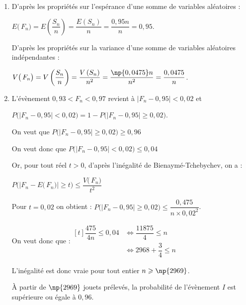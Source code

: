 \begin{enumerate}
	\begin{enumerate}
		\item D'après les propriétés sur l'espérance d'une somme de variables aléatoires :

$E\big(\,F_{n}\big)= E\left(\dfrac{S_{n}}{n}\right) = \dfrac{E\left( S_{n}\right)}{n}= \dfrac{0,95n}{n}= 0,95 $.

D'après les propriétés sur la variance d'une somme de variables aléatoires indépendantes :

$V\big(\,F_{n}\big)= V\left(\dfrac{S_{n}}{n}\right) = \dfrac{V\left( S_{n}\right)}{n^2}= \dfrac{\np{0,0475}n}{n^2}= \dfrac{0,0475}{n}$.

	\item L'évènement \og $0,93 <F_{n}< 0,97$ \fg{} revient à $\big|F_{n} - 0,95 \big| < 0,02$ et

$P\Big(\big|F_n - 0,95 \big| < 0,02\Big) = 1 - P\Big(\big|F_{n} - 0,95 \big| \geqslant 0,02\Big)$.

On veut que $P\Big(\big|F_{n} - 0,95 \big| \geqslant 0,02\Big) \geqslant 0,96$

On veut donc que $P\Big(\big|F_n - 0,95 \big| < 0,02\Big) \leqslant 0,04$

Or, pour tout réel $t > 0$, d'après l'inégalité de Bienaymé-Tchebychev, on a :

$P\Big(\big|F_n-E\big(\,F_n\big)\big| \geqslant t\Big) \leqslant \dfrac{V\big(\,F_n\big)}{t^2}$

Pour $t = 0,02$ on obtient : $ P\Big(\big|F_n-0,95\big| \geqslant 0,02\Big)\leqslant \dfrac{0,475}{ n \times 0,02^2}$.

On veut donc que :\quad $\begin{aligned}[t]
		\dfrac{475}{4 n} \leqslant 0,04 &\iff
		\dfrac{11875}{4} \leqslant n \\
		&\iff 2968+\dfrac{3}{4}\leqslant n
	\end{aligned}$

L'inégalité est donc vraie pour tout entier $n \geqslant \np{2969}$.

À partir de $\np{2969}$ jouets prélevés, la probabilité de l'évènement $I$ est supérieure ou égale à $0,96$.
	\end{enumerate}
\end{enumerate}

\medskip

